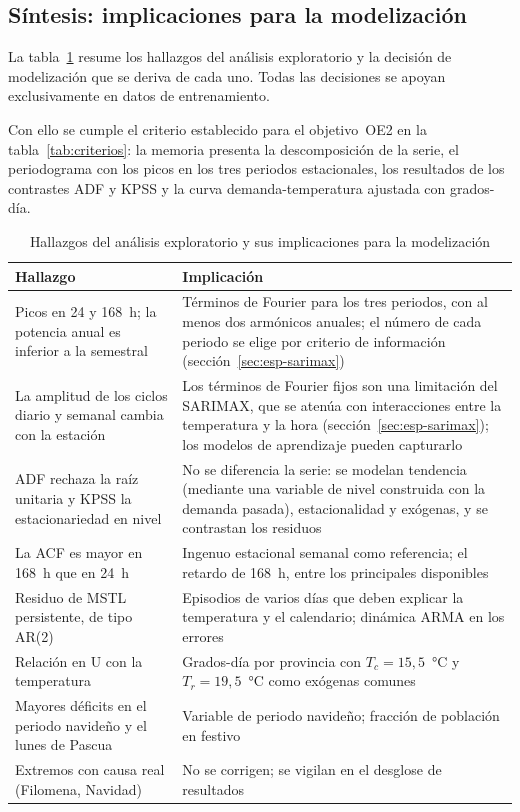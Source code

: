 \subsection{Síntesis: implicaciones para la modelización}\label{sec:explo-sintesis}

La tabla~\ref{tab:sintesis-oe2} resume los hallazgos del análisis
exploratorio y la decisión de modelización que se deriva de cada uno. Todas
las decisiones se apoyan exclusivamente en datos de entrenamiento.

Con ello se cumple el criterio establecido para el objetivo~OE2 en la
tabla~\ref{tab:criterios}: la memoria presenta la descomposición de la serie,
el periodograma con los picos en los tres periodos estacionales, los
resultados de los contrastes ADF y KPSS y la curva demanda-temperatura
ajustada con grados-día.

\begin{table}[H]
	\centering
	\caption{Hallazgos del análisis exploratorio y sus implicaciones para la modelización}
	\label{tab:sintesis-oe2}
	\small
	\begin{tabularx}{\textwidth}{>{\raggedright\arraybackslash}X >{\raggedright\arraybackslash}X}
		\hline
		\textbf{Hallazgo} & \textbf{Implicación} \\
		\hline
		Picos en 24 y 168~h; la potencia anual es inferior a la semestral & Términos de Fourier para los tres periodos, con al menos dos armónicos anuales; el número de cada periodo se elige por criterio de información (sección~\ref{sec:esp-sarimax}) \\
		La amplitud de los ciclos diario y semanal cambia con la estación & Los términos de Fourier fijos son una limitación del SARIMAX, que se atenúa con interacciones entre la temperatura y la hora (sección~\ref{sec:esp-sarimax}); los modelos de aprendizaje pueden capturarlo \\
		ADF rechaza la raíz unitaria y KPSS la estacionariedad en nivel & No se diferencia la serie: se modelan tendencia (mediante una variable de nivel construida con la demanda pasada), estacionalidad y exógenas, y se contrastan los residuos \\
		La ACF es mayor en 168~h que en 24~h & Ingenuo estacional semanal como referencia; el retardo de 168~h, entre los principales disponibles \\
		Residuo de MSTL persistente, de tipo AR(2) & Episodios de varios días que deben explicar la temperatura y el calendario; dinámica ARMA en los errores \\
		Relación en U con la temperatura & Grados-día por provincia con $T_c = 15{,}5$~°C y $T_r = 19{,}5$~°C como exógenas comunes \\
		Mayores déficits en el periodo navideño y el lunes de Pascua & Variable de periodo navideño; fracción de población en festivo \\
		Extremos con causa real (Filomena, Navidad) & No se corrigen; se vigilan en el desglose de resultados \\
		\hline
	\end{tabularx}
\end{table}

